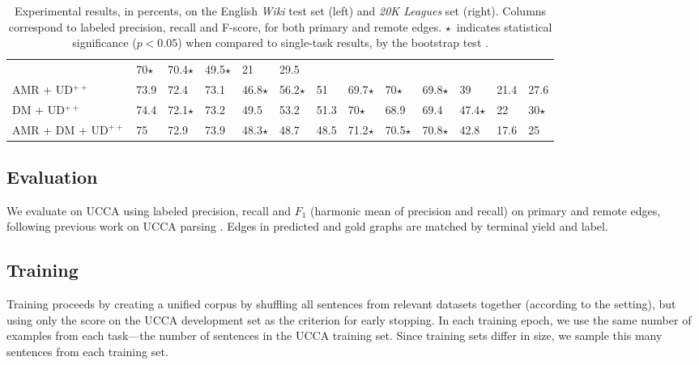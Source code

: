 \documentclass[11pt,a4paper]{article}
\begin{document}
\begin{table*}
\begin{tabular}{l|lll|lll||lll|lll}
& 70$\star$ & 70.4$\star$ & 49.5$\star$ & 21 & 29.5 \\
\small AMR + UD$^{++}$
& 73.9 & 72.4 & 73.1 & 46.8$\star$ & 56.2$\star$ & 51
& 69.7$\star$ & 70$\star$ & 69.8$\star$ & 39 & 21.4 & 27.6 \\
\small DM + UD$^{++}$
& 74.4 & 72.1$\star$ & 73.2 & 49.5 & 53.2 & 51.3
& 70$\star$ & 68.9 & 69.4 & 47.4$\star$ & 22 & 30$\star$ \\
\small AMR + DM + UD$^{++}$
& 75 & 72.9 & 73.9 & 48.3$\star$ & 48.7 & 48.5
& 71.2$\star$ & 70.5$\star$ & 70.8$\star$ & 42.8 & 17.6 & 25
\end{tabular}
\caption{
Experimental results, in percents, on the English \textit{Wiki} test set (left)
and \textit{20K Leagues} set (right).
Columns correspond to labeled precision, recall and F-score,
for both primary and remote edges.
$\star$~indicates statistical significance ($p<0.05$)
when compared to single-task results,
by the bootstrap test \cite{berg2012empirical}.
}
\label{tab:results}
\end{table*}


\subsection{Evaluation}\label{sec:evaluation}

We evaluate on UCCA using labeled precision, recall and $F_1$ (harmonic mean of precision and recall)
on primary and remote edges,
following previous work on UCCA parsing \cite{hershcovich2017a}.
Edges in predicted and gold graphs are matched by terminal yield and label.



\subsection{Training}\label{sec:training}

Training proceeds by creating a unified corpus by shuffling all sentences from relevant
datasets together (according to the setting),
but using only the score on the UCCA development set as the criterion for early stopping.
In each training epoch, we use the same number of examples from each task---the
number of sentences in the UCCA training set.
Since training sets differ in size, we sample this many sentences from each training set.
\end{document}
